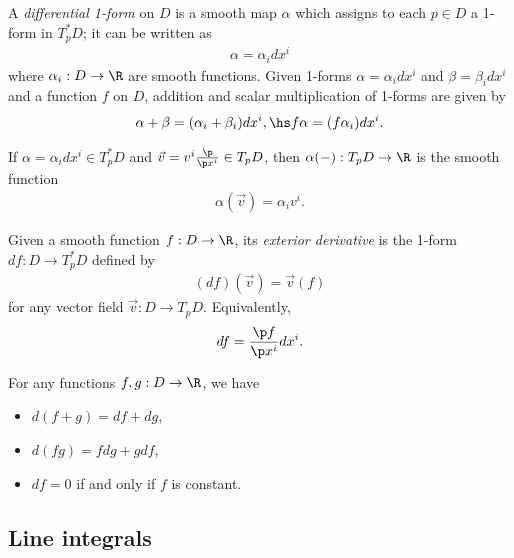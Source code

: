 \documentclass{article}
\begin{document}
\begin{definition}
    A \emph{differential 1-form} on $D$ is a smooth map $\alpha$ which assigns to each $p\in D$
    a 1-form in $T^*_pD$; it can be written as
    \begin{align*}
        \alpha = \alpha_i dx^i
    \end{align*}
    where $\alpha_i:D\to\R$ are smooth functions. Given 1-forms $\alpha=\alpha_idx^i$ and 
    $\beta=\beta_idx^i$ and a function $f$ on $D$, addition and scalar multiplication of 
    1-forms are given by
    \begin{align*}
        \alpha + \beta = (\alpha_i + \beta_i)dx^i,\hs f\alpha = (f\alpha_i)dx^i.
    \end{align*}
\end{definition}

\begin{lemma}[Notes 4.16]
    If $\alpha=\alpha_i dx^i\in T_p^*D$ and $\vec v=v^i\frac{\p }{\p x^i}\in T_pD$,
    then $\alpha(-):T_pD\to\R$ is the smooth function
    \begin{align*}
        \alpha(\vec v) = \alpha_i v^i.    
    \end{align*}
\end{lemma}

\begin{definition}
    Given a smooth function $f:D\to\R$, its \emph{exterior derivative} is the 1-form 
    $df:D\to T^*_pD$ defined by
    \begin{align*}
        (df)(\vec v) = \vec v(f)
    \end{align*}
    for any vector field $\vec v:D\to T_pD$. Equivalently,
    \begin{align*}
        df=\frac{\p f}{\p x^i}dx^i.
    \end{align*}
\end{definition}

\begin{proposition}[Notes 4.20]
    For any functions $f,g:D\to\R$, we have 
    \begin{itemize}
        \item $d(f+g)=df + dg$,
        \item $d(fg) =fdg + gdf$,
        \item $df=0$ if and only if $f$ is constant.
    \end{itemize}
\end{proposition}

\subsection{Line integrals}
\end{document}
